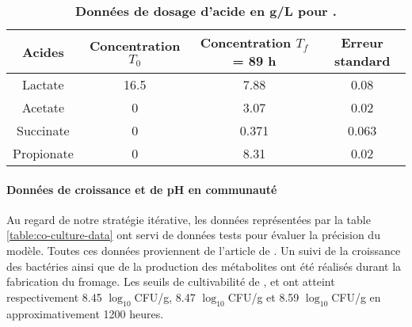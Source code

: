 \begin{table}[H]
\centering
\begin{adjustbox}{width=1\textwidth}
\begin{tabular}{|c|c|c|c|}
\hline
Acides & Concentration $T_0$ & Concentration $T_{f}$ = 89 h  & Erreur standard \\
\hline
Lactate & 16.5 & 7.88 & 0.08 \\
Acetate & 0 & 3.07 & 0.02\\
Succinate & 0 & 0.371 & 0.063 \\
Propionate & 0 & 8.31 & 0.02 \\
 \hline
\end{tabular}
\end{adjustbox}
\caption{\textbf{Données de dosage d'acide en g/L pour \freud.}}
\label{table:acids-dosage}
\end{table}

\paragraph*{Données de croissance et de pH en communauté}
\label{com_data}
Au regard de notre stratégie itérative, les données représentées par la table \ref{table:co-culture-data} ont servi de données tests pour évaluer la précision du modèle. Toutes ces données proviennent de l'article de \citep{Cao2021}. Un suivi de la croissance des bactéries ainsi que de la production des métabolites ont été réalisés durant la fabrication du fromage. Les seuils de cultivabilité de \lactis, \plantarum et \freud ont atteint respectivement 8.45 $\log_{10}$CFU/g, 8.47 $\log_{10}$CFU/g et 8.59 $\log_{10}$CFU/g en approximativement 1200 heures.

